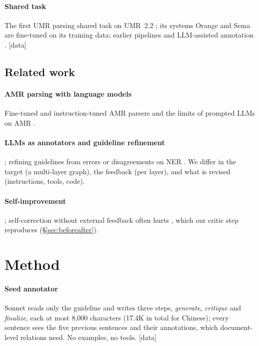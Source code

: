 \documentclass[11pt]{article}
\newcommand{\stag}[2]{\textcolor{#1}{\textsf{\scriptsize[#2]}}}
\newcommand{\HAVE}{\stag{green!50!black}{data}\xspace}
\begin{document}
\paragraph{Shared task}
The first UMR parsing shared task \citep{stepanek2026first} on UMR~2.2 \citep{bonn2026uniform}; its systems Orange \citep{heinecke2026orange} and Sema \citep{devergnette2026sema} are fine-tuned on its training data; earlier pipelines and LLM-assisted annotation \citep{chun2024pipeline,sun2024chinese,gamba2025bootstrapping}. \HAVE

\subsection{Related work}

\paragraph{AMR parsing with language models}
Fine-tuned and instruction-tuned AMR parsers and the limits of prompted LLMs on AMR \citep{lee2023amr,ho2025evaluation,barta2025enhancing,ettinger2023you}.

\paragraph{LLMs as annotators and guideline refinement}
\citet{gilardi2023chatgpt,he2024annollm}; refining guidelines from errors or disagreements on NER \citep{kim2026refining,kim2026diziner}. We differ in the target (a multi-layer graph), the feedback (per layer), and what is revised (instructions, tools, code).

\paragraph{Self-improvement}
\citet{madaan2023selfrefine,shinn2023reflexion,zelikman2024self,lee2026metaharness}; self-correction without external feedback often hurts \citep{huang2024large,kamoi2024when}, which our critic step reproduces (\S\ref{sec:beforeafter}).

\section{Method}
\label{sec:method}

\paragraph{Seed annotator}
Sonnet reads only the guideline and writes three steps, \emph{generate}, \emph{critique} and \emph{finalize}, each at most 8,000 characters (17.4K in total for Chinese); every sentence sees the five previous sentences and their annotations, which document-level relations need. No examples, no tools. \HAVE
\end{document}
